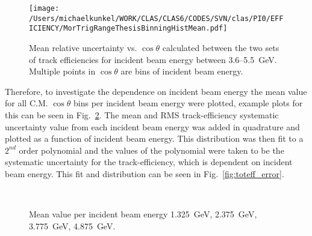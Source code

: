 			\begin{figure}[h!]\begin{center}
					\texttt{[image: /Users/michaelkunkel/WORK/CLAS/CLAS6/CODES/SVN/clas/PI0/EFFICIENCY/MorTrigRangeThesisBinningHistMean.pdf]}
					\caption{Mean relative uncertainty vs. $\cos \theta$ calculated between the two sets of track efficiencies for incident beam energy between 3.6--5.5~GeV. Multiple points in $\cos \theta$ are bins of incident beam energy.}\label{fig:mortrigcostheta}
				\end{center}\end{figure}
				
				\FloatBarrier
				Therefore, to investigate the dependence on incident beam energy the mean value for all C.M. $\cos \theta$ bins per incident beam energy were plotted, example plots for this can be seen in Fig.~\ref{fig:CGLN1}. The mean and RMS track-efficiency systematic uncertainty value from each incident beam energy was added in quadrature and plotted as a function of incident beam energy. This distribution was then fit to a $2^{nd}$ order polynomial and the values of the polynomial were taken to be the systematic uncertainty for the track-efficiency, which is dependent on incident beam energy. This fit and distribution can be seen in Fig.~\ref{fig:toteff_error}.
				
				\begin{figure}[!ht]
					\centering
					
					 \quad
					 \\
					 \quad
					\caption[Mean value per incident beam energy ]{Mean value per incident beam energy 1.325~GeV, 2.375~GeV, 3.775~GeV, 4.875~GeV.}
					\label{fig:CGLN1}
				\end{figure}
				
